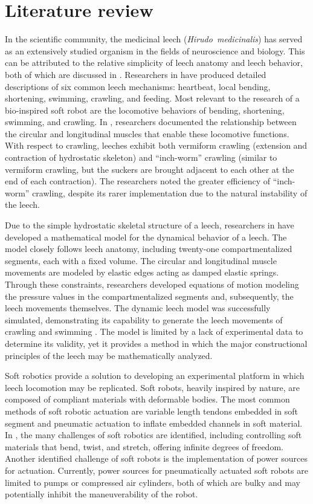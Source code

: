 \documentclass{IEEEtran}
\newcommand{\Gensp}[1]{\emph{#1}}
\newcommand{\Hirudomedicinalis}{\Gensp{Hirudo~medicinalis}}
\begin{document}
\section{Literature review}
In the scientific community, the medicinal leech (\Hirudomedicinalis) has served as an extensively studied organism in the fields of neuroscience and biology.  This can be attributed to the relative simplicity of leech anatomy and leech behavior, both of which are discussed in \cite{kristan2005neuronal}.  Researchers in \cite{kristan2005neuronal} have produced detailed descriptions of six common leech mechanisms: heartbeat, local bending, shortening, swimming, crawling, and feeding.  Most relevant to the research of a bio-inspired soft robot are the locomotive behaviors of bending, shortening, swimming, and crawling.  In \cite{kristan2005neuronal}, researchers documented the relationship between the circular and longitudinal muscles that enable these locomotive functions.  With respect to crawling, leeches exhibit both vermiform crawling (extension and contraction of hydrostatic skeleton) and ``inch-worm'' crawling (similar to vermiform crawling, but the suckers are brought adjacent to each other at the end of each contraction).  The researchers noted the greater efficiency of ``inch-worm'' crawling, despite its rarer implementation due to the natural instability of the leech.

Due to the simple hydrostatic skeletal structure of a leech, researchers in \cite{alscher1998simulating} have developed a mathematical model for the dynamical behavior of a leech.  The model closely follows leech anatomy, including twenty-one compartmentalized segments, each with a fixed volume.  The circular and longitudinal muscle movements are modeled by elastic edges acting as damped elastic springs.  Through these constraints, researchers developed equations of motion modeling the pressure values in the compartmentalized segments and, subsequently, the leech movements themselves.  The dynamic leech model was successfully simulated, demonstrating its capability to generate the leech movements of crawling and swimming \cite{alscher1998simulating}.  The model is limited by a lack of experimental data to determine its validity, yet it provides a method in which the major constructional principles of the leech may be mathematically analyzed. 

Soft robotics provide a solution to developing an experimental platform in which leech locomotion may be replicated.  Soft robots, heavily inspired by nature, are composed of compliant materials with deformable bodies.  The most common methods of soft robotic actuation are variable length tendons embedded in soft segment and pneumatic actuation to inflate embedded channels in soft material. In \cite{rus2015design}, the many challenges of soft robotics are identified, including controlling soft materials that bend, twist, and stretch, offering infinite degrees of freedom.  Another identified challenge of soft robots is the implementation of power sources for actuation.  Currently, power sources for pneumatically actuated soft robots are limited to pumps or compressed air cylinders, both of which are bulky and may potentially inhibit the maneuverability of the robot. 
\end{document}
